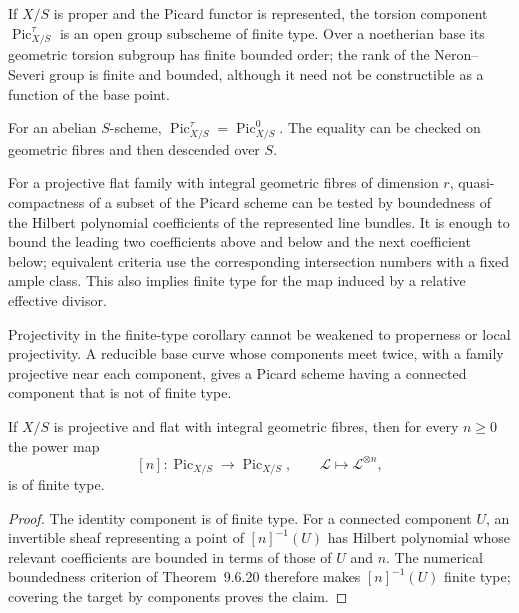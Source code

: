 \begin{remark}\label{fga-rem-9-6-19}
If $X/S$ is proper and the Picard functor is represented, the torsion component
$\operatorname{Pic}^{\tau}_{X/S}$ is an open group subscheme of finite type.
Over a noetherian base its geometric torsion subgroup has finite bounded order;
the rank of the Neron--Severi group is finite and bounded, although it need not
be constructible as a function of the base point.
\end{remark}

\begin{remark}\label{fga-rem-9-6-22}\uses{}
For an abelian $S$-scheme, $\operatorname{Pic}^{\tau}_{X/S}
=\operatorname{Pic}^0_{X/S}$.  The equality can be checked on geometric fibres
and then descended over $S$.
\end{remark}

\begin{remark}\label{fga-rem-9-6-24}
For a projective flat family with integral geometric fibres of dimension $r$,
quasi-compactness of a subset of the Picard scheme can be tested by boundedness
of the Hilbert polynomial coefficients of the represented line bundles.  It is
enough to bound the leading two coefficients above and below and the next
coefficient below; equivalent criteria use the corresponding intersection
numbers with a fixed ample class.  This also implies finite type for the map
induced by a relative effective divisor.
\end{remark}

\begin{remark}\label{fga-rem-9-6-26}\uses{}
Projectivity in the finite-type corollary cannot be weakened to properness or
local projectivity.  A reducible base curve whose components meet twice, with a
family projective near each component, gives a Picard scheme having a connected
component that is not of finite type.
\end{remark}

\begin{corollary}\label{fga-cor-9-6-27}
If $X/S$ is projective and flat with integral geometric fibres, then for every
$n\ge0$ the power map
\[
[n]:\operatorname{Pic}_{X/S}\longrightarrow\operatorname{Pic}_{X/S},
\qquad\mathcal L\longmapsto\mathcal L^{\otimes n},
\]
is of finite type.
\end{corollary}
\begin{proof}
The identity component is of finite type.  For a connected component $U$, an
invertible sheaf representing a point of $[n]^{-1}(U)$ has Hilbert polynomial
whose relevant coefficients are bounded in terms of those of $U$ and $n$.
The numerical boundedness criterion of Theorem~9.6.20 therefore makes
$[n]^{-1}(U)$ finite type; covering the target by components proves the claim.
\end{proof}

